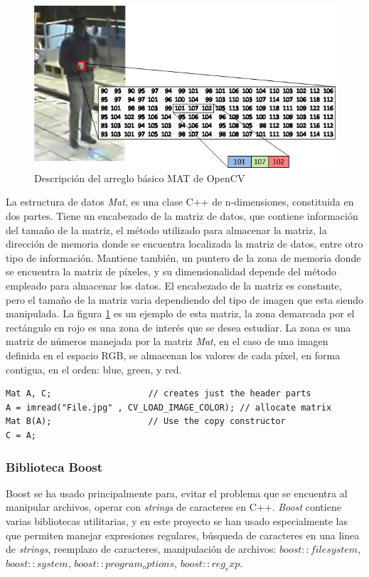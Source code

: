 \begin{figure}[h!]
\centering
\includegraphics[scale=0.7]{img/Opencv_mat}
\caption[OpenCV arreglo Mat ]{Descripción del arreglo básico MAT de OpenCV}
\label{fig:mat}
\end{figure}


La estructura de datos \textit{Mat}, es una clase C++ de n-dimensiones, constituida en dos partes. Tiene un encabezado de la matriz de datos, que contiene información del tamaño de la matriz, el método utilizado para almacenar la matriz, la dirección de memoria donde se encuentra localizada la matriz de datos, entre otro tipo de información. Mantiene también, un puntero de la zona de memoria donde se encuentra la matriz de píxeles, y su dimensionalidad depende del método empleado para almacenar los datos. El encabezado de la matriz es constante, pero el tamaño de la matriz varia dependiendo del tipo de imagen que esta siendo manipulada. La figura \ref{fig:mat} es un ejemplo de esta matriz, la zona demarcada por el rectángulo en rojo es una zona de interés que se desea estudiar. La zona es una matriz de números manejada por la matriz \textit{Mat}, en el caso de una imagen definida en el espacio RGB, se almacenan los valores de cada píxel, en forma contigua, en el orden: blue, green, y red.\\


\begin{lstlisting}
Mat A, C;                   // creates just the header parts
A = imread("File.jpg" , CV_LOAD_IMAGE_COLOR); // allocate matrix
Mat B(A);                   // Use the copy constructor
C = A;    
\end{lstlisting}

\subsubsection{Biblioteca Boost}
Boost \cite{boost} se ha usado principalmente para, evitar el problema que se encuentra al manipular archivos, operar con \textit{strings} de caracteres en C++. \textit{Boost} contiene varias bibliotecas utilitarias, y en este proyecto se han usado especialmente las que permiten manejar expresiones regulares, búsqueda de caracteres en una linea de \textit{strings}, reemplazo de caracteres, manipulación de archivos: $boost::filesystem$, $boost::system$, $boost::program_options$, $boost::reg_exp$.


